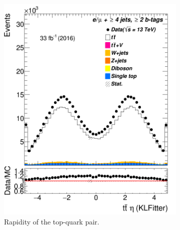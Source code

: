 \begin{figure}
	\begin{subfigure}{0.25\textwidth}
		\includegraphics[width=\linewidth]{ControlPlots_emujets_2016_4incl_2incl/klf_ttbar_eta_emujets_2016.png}
		\caption{Rapidity of the top-quark pair.} \label{fig:K18}
	\end{subfigure}
	\hspace*{0.5cm}
	\begin{subfigure}{0.25\textwidth}

\end{subfigure}
\end{figure}
